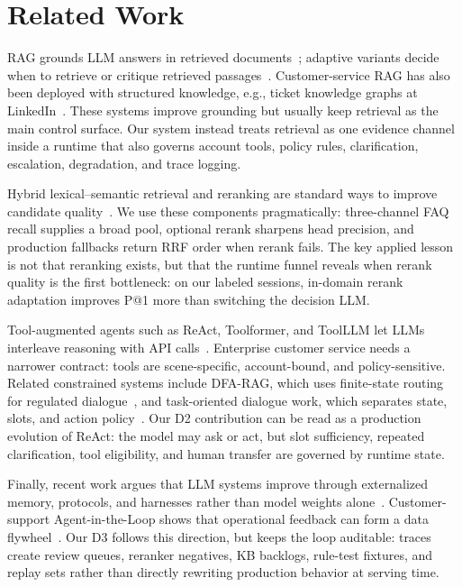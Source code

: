 \documentclass[sigconf,review]{acmart}
\begin{document}
\section{Related Work}
RAG grounds LLM answers in retrieved documents~\cite{lewis2020rag,gao2024ragsurvey}; adaptive variants decide when to retrieve or critique retrieved passages~\cite{asai2024selfrag,jeong2024adaptiverag,yan2024crag}. Customer-service RAG has also been deployed with structured knowledge, e.g., ticket knowledge graphs at LinkedIn~\cite{xu2024cskg}. These systems improve grounding but usually keep retrieval as the main control surface. Our system instead treats retrieval as one evidence channel inside a runtime that also governs account tools, policy rules, clarification, escalation, degradation, and trace logging.

Hybrid lexical--semantic retrieval and reranking are standard ways to improve candidate quality~\cite{robertson2009bm25,chen2022hybrid,bruch2023fusion,nogueira2019bert,xiao2024bge}. We use these components pragmatically: three-channel FAQ recall supplies a broad pool, optional rerank sharpens head precision, and production fallbacks return RRF order when rerank fails. The key applied lesson is not that reranking exists, but that the runtime funnel reveals when rerank quality is the first bottleneck: on our labeled sessions, in-domain rerank adaptation improves P@1 more than switching the decision LLM.

Tool-augmented agents such as ReAct, Toolformer, and ToolLLM let LLMs interleave reasoning with API calls~\cite{yao2023react,schick2023toolformer,qin2023toolllm}. Enterprise customer service needs a narrower contract: tools are scene-specific, account-bound, and policy-sensitive. Related constrained systems include DFA-RAG, which uses finite-state routing for regulated dialogue~\cite{sun2024dfarag}, and task-oriented dialogue work, which separates state, slots, and action policy~\cite{young2013pomdp,wen2017network,chung2023instructtods}. Our D2 contribution can be read as a production evolution of ReAct: the model may ask or act, but slot sufficiency, repeated clarification, tool eligibility, and human transfer are governed by runtime state.

Finally, recent work argues that LLM systems improve through externalized memory, protocols, and harnesses rather than model weights alone~\cite{shinn2023reflexion,zhou2026externalization}. Customer-support Agent-in-the-Loop shows that operational feedback can form a data flywheel~\cite{zhao2025agentloop}. Our D3 follows this direction, but keeps the loop auditable: traces create review queues, reranker negatives, KB backlogs, rule-test fixtures, and replay sets rather than directly rewriting production behavior at serving time.
\end{document}
